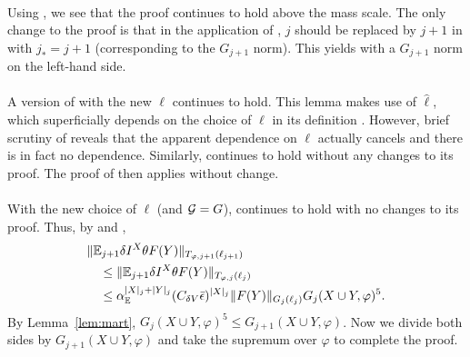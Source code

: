 \paragraph{\cite[Proposition~\ref{IE-prop:hldg}]{BS-rg-IE}}
Using , we see that the proof
continues to hold
above the mass scale.
The only change to the proof is that in the application of
\cite[Proposition~\ref{IE-prop:Istab}]{BS-rg-IE}, $j$ should be replaced by
$j + 1$ in \cite[\eqref{IE-e:IF}]{BS-rg-IE} with $j_* = j + 1$ (corresponding
to the $G_{j+1}$ norm). This yields \cite[\eqref{IE-e:2Lprimeh1}]{BS-rg-IE}
with a $G_{j+1}$ norm on the left-hand side.

\paragraph{\cite[Proposition~\ref{IE-prop:h}]{BS-rg-IE}}
A version of \cite[Lemma~\ref{IE-lem:dIipV}]{BS-rg-IE} with the new $\ell$
continues to hold. This lemma makes use of $\hat\ell$,
which superficially depends on the choice of $\ell$ in its definition
\cite[\eqref{IE-e:ellhatdef}]{BS-rg-IE}. However, brief scrutiny of
\cite[\eqref{IE-e:ellhatdef}]{BS-rg-IE} reveals that
the apparent dependence on $\ell$ actually cancels and there is in fact no dependence.
Similarly,
\cite[Lemma~\ref{IE-lem:epdV}]{BS-rg-IE} continues to hold without
any changes to its proof.
The proof of \cite[Proposition~\ref{IE-prop:h}]{BS-rg-IE} then applies without change.

\paragraph{\cite[Proposition~\ref{IE-prop:ip}]{BS-rg-IE}}
With the new choice of $\ell$ (and $\mathcal{G} = G$),
\cite[Lemma~\ref{IE-lem:dIip}]{BS-rg-IE} continues to hold with no changes to its proof.
Thus, by \cite[\eqref{IE-e:scale-change}]{BS-rg-IE}
and \cite[Lemma~\ref{IE-lem:dIip}]{BS-rg-IE},
\begin{align}
\label{e:integration-property-pf}
&\|\mathbb{E}_{j+1} \delta I^X \theta F(Y) \|_{T_{\varphi,j+1}(\ell_{j+1})}
	\nonumber \\
&\quad \leq
\|\mathbb{E}_{j+1} \delta I^X \theta F(Y) \|_{T_{\varphi,j}(\ell_{j})} \nonumber \\
&\quad \leq
\alpha_{{\mathbb E}}^{|X|_j+|Y|_j}
(C_{\delta V} \bar{\epsilon})^{|X|_j}
\| F(Y) \|_{G_j(\ell_{j})}
G_j(X\cup Y,\varphi)^5
.
\end{align}
By Lemma~\ref{lem:mart}, $G_j(X\cup Y,\varphi)^5 \le G_{j+1}(X\cup Y,\varphi)$.
Now we divide both sides by
$G_{j+1}(X \cup Y, \varphi)$ and take the supremum over $\varphi$ to complete the proof.

